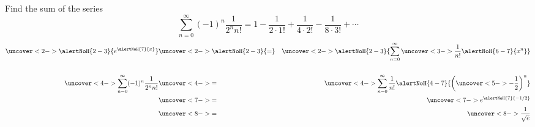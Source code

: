 \begin{frame}
\begin{example}
Find the sum of the series
\abovedisplayskip=0pt
\belowdisplayskip=0pt
\[
\sum_{n=0}^\infty (-1)^n\frac{1}{2^nn!} = 1 - \frac{1}{2\cdot 1!} + \frac{1}{4\cdot 2!} - \frac{1}{8\cdot 3!} + \cdots
\]
\abovedisplayskip=0pt
\belowdisplayskip=0pt
\begin{eqnarray*}
\uncover<2->{%
\alertNoH{2-3}{%
e^{\alertNoH{ 7}{x}}%
}%
}%
& \uncover<2->{\alertNoH{ 2-3}{=}} & %
\uncover<2->{%
\alertNoH{ 2-3}{%
\sum_{n=0}^\infty \uncover<3->{\frac{1}{n!}\alertNoH{ 6-7}{x^n}}%
}%
}\\%
& & \\%
\uncover<4->{%
\sum_{n=0}^\infty (-1)^n\frac{1}{2^nn!}%
}%
& \uncover<4->{=} & %
\uncover<4->{%
\sum_{n=0}^\infty \frac{1}{n!}\alertNoH{ 4-7}{ \left( \uncover<5->{-\frac{1}{2}}\right)^n}%
}\\%
& \uncover<7->{=} & %
\uncover<7->{%
e^{\alertNoH{ 7}{-1/2}}
}\\%
& \uncover<8->{=} & %
\uncover<8->{%
\frac{1}{\sqrt{e}}
}%
\end{eqnarray*}
\end{example}
\end{frame}
